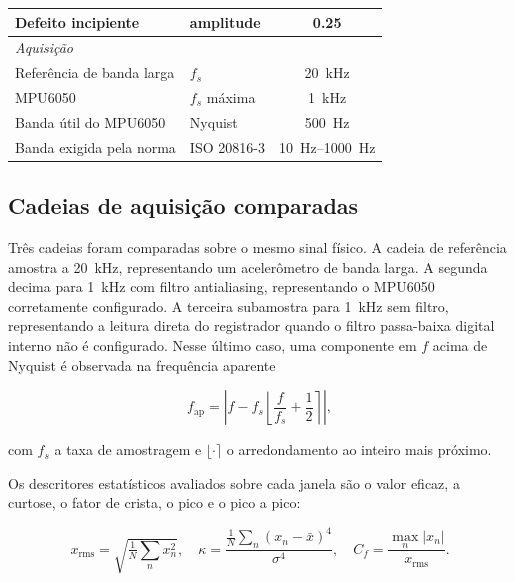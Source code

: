 \documentclass[11pt,a4paper]{article}
\begin{document}
\begin{table}[!htb]
\begin{tabular}{llc}
Defeito incipiente           & amplitude               & \num{0,25} \\
\midrule
\multicolumn{3}{l}{\itshape Aquisição} \\
Referência de banda larga    & $f_s$                   & \SI{20}{\kilo\hertz} \\
MPU6050                      & $f_s$ máxima            & \SI{1}{\kilo\hertz} \\
Banda útil do MPU6050        & Nyquist                 & \SI{500}{\hertz} \\
Banda exigida pela norma     & ISO 20816-3             & \SIrange{10}{1000}{\hertz} \\
\bottomrule
\end{tabular}
\end{table}

\subsection{Cadeias de aquisição comparadas}
\label{ssec:cadeias}

Três cadeias foram comparadas sobre o mesmo sinal físico. A cadeia de referência amostra
a \SI{20}{\kilo\hertz}, representando um acelerômetro de banda larga. A segunda decima
para \SI{1}{\kilo\hertz} com filtro antialiasing, representando o MPU6050 corretamente
configurado. A terceira subamostra para \SI{1}{\kilo\hertz} sem filtro, representando a
leitura direta do registrador quando o filtro passa-baixa digital interno não é
configurado. Nesse último caso, uma componente em $f$ acima de Nyquist é observada na
frequência aparente

\begin{equation}
f_{\mathrm{ap}} = \left| f - f_s \left\lfloor \frac{f}{f_s} + \frac{1}{2} \right\rceil \right|,
\label{eq:alias}
\end{equation}

\noindent
com $f_s$ a taxa de amostragem e $\lfloor\cdot\rceil$ o arredondamento ao inteiro mais
próximo.

Os descritores estatísticos avaliados sobre cada janela são o valor eficaz, a curtose, o
fator de crista, o pico e o pico a pico:

\begin{equation}
x_{\mathrm{rms}} = \sqrt{\tfrac{1}{N}\textstyle\sum_n x_n^2},
\quad
\kappa = \frac{\tfrac{1}{N}\sum_n (x_n-\bar{x})^4}{\sigma^4},
\quad
C_f = \frac{\max_n |x_n|}{x_{\mathrm{rms}}}.
\label{eq:descritores}
\end{equation}
\end{document}
